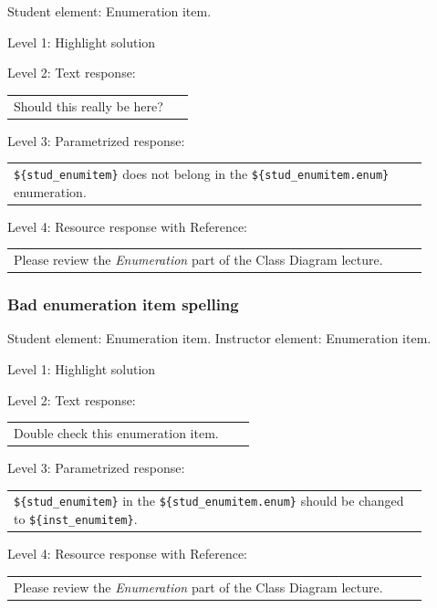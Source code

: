 Student element: Enumeration item.  \medskip

\noindent Level 1: Highlight solution  \medskip

\noindent Level 2: Text response: \medskip

\begin{tabular}{|p{0.9\linewidth}}
Should this really be here?
\end{tabular} \medskip

\noindent Level 3: Parametrized response: \medskip

\begin{tabular}{|p{0.9\linewidth}}
\verb|${stud_enumitem}| does not belong in the \verb|${stud_enumitem.enum}| enumeration.
\end{tabular} \medskip

\noindent Level 4: Resource response with Reference: \medskip

\begin{tabular}{|p{0.9\linewidth}}
Please review the \textit{Enumeration} part of the Class Diagram lecture.
\end{tabular} \medskip


\subsubsection{Bad enumeration item spelling}

Student element: Enumeration item. Instructor element: Enumeration item. \medskip

\noindent Level 1: Highlight solution  \medskip

\noindent Level 2: Text response: \medskip

\begin{tabular}{|p{0.9\linewidth}}
Double check this enumeration item.
\end{tabular} \medskip

\noindent Level 3: Parametrized response: \medskip

\begin{tabular}{|p{0.9\linewidth}}
\verb|${stud_enumitem}| in the \verb|${stud_enumitem.enum}| should be changed to \verb|${inst_enumitem}|.
\end{tabular} \medskip

\noindent Level 4: Resource response with Reference: \medskip

\begin{tabular}{|p{0.9\linewidth}}
Please review the \textit{Enumeration} part of the Class Diagram lecture.
\end{tabular} \medskip


